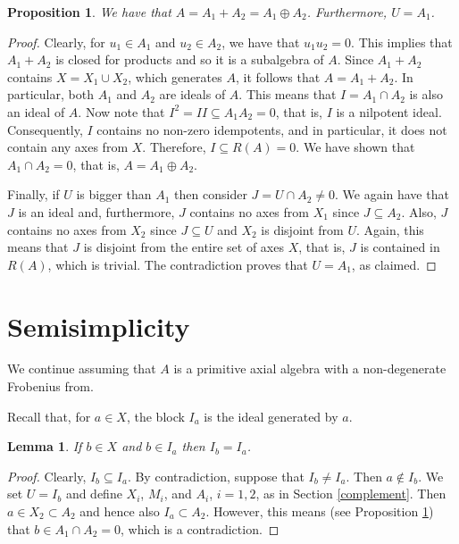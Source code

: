 \documentclass[12pt]{article}
\newtheorem{lemma}[theorem]{Lemma}
\newtheorem{proposition}[theorem]{Proposition}
\begin{document}
\begin{proposition} \label{decomposition}
We have that $A=A_1+A_2=A_1\oplus A_2$. Furthermore, $U=A_1$.
\end{proposition}

\begin{proof}
Clearly, for $u_1\in A_1$ and $u_2\in A_2$, we have that $u_1u_2=0$. This implies 
that $A_1+A_2$ is closed for products and so it is a subalgebra of $A$. Since 
$A_1+A_2$ contains $X=X_1\cup X_2$, which generates $A$, it follows that $A=A_1+A_2$. 
In particular, both $A_1$ and $A_2$ are ideals of $A$. This means that $I=A_1\cap 
A_2$ is also an ideal of $A$. Now note that $I^2=II\subseteq A_1A_2=0$, that is, $I$ 
is a nilpotent ideal. Consequently, $I$ contains no non-zero idempotents, and in 
particular, it does not contain any axes from $X$. Therefore, $I\subseteq R(A)=0$. We 
have shown that $A_1\cap A_2=0$, that is, $A=A_1\oplus A_2$.

Finally, if $U$ is bigger than $A_1$ then consider $J=U\cap A_2\neq 0$. We again have 
that $J$ is an ideal and, furthermore, $J$ contains no axes from $X_1$ since 
$J\subseteq A_2$. Also, $J$ contains no axes from $X_2$ since $J\subseteq U$ and 
$X_2$ is disjoint from $U$. Again, this means that $J$ is disjoint from the entire 
set of axes $X$, that is, $J$ is contained in $R(A)$, which is trivial. The 
contradiction proves that $U=A_1$, as claimed.
\end{proof}

\section{Semisimplicity} \label{semisimplicity}

We continue assuming that $A$ is a primitive axial algebra with a non-degenerate 
Frobenius from.

Recall that, for $a\in X$, the block $I_a$ is the ideal generated by $a$. 

\begin{lemma} \label{equal}
If $b\in X$ and $b\in I_a$ then $I_b=I_a$.
\end{lemma}

\begin{proof}
Clearly, $I_b\subseteq I_a$. By contradiction, suppose that $I_b\neq I_a$. Then 
$a\notin I_b$. We set $U=I_b$ and define $X_i$, $M_i$, and $A_i$, $i=1,2$, as in 
Section \ref{complement}. Then $a\in X_2\subset A_2$ and hence also $I_a\subset A_2$. 
However, this means (see Proposition \ref{decomposition}) that $b\in A_1\cap A_2=0$, 
which is a contradiction. 
\end{proof}
\end{document}
